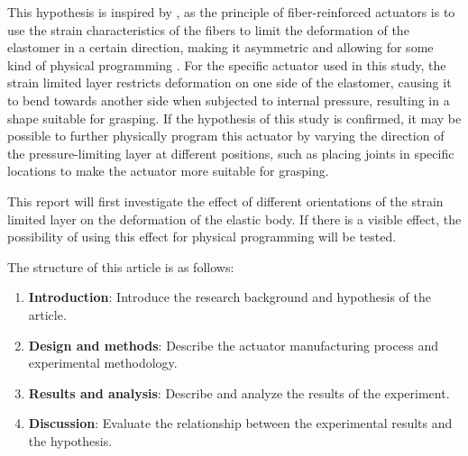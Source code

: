 \documentclass[conference]{IEEEtran}
\begin{document}
This hypothesis is inspired by \cite{mechanical_programing}, as the principle of fiber-reinforced actuators is to use the strain characteristics of the fibers to limit the deformation of the elastomer in a certain direction, making it asymmetric and allowing for some kind of physical programming \cite{fingerlike}. For the specific actuator used in this study, the strain limited layer restricts deformation on one side of the elastomer, causing it to bend towards another side when subjected to internal pressure, resulting in a shape suitable for grasping. If the hypothesis of this study is confirmed, it may be possible to further physically program this actuator by varying the direction of the pressure-limiting layer at different positions, such as placing joints in specific locations to make the actuator more suitable for grasping.


This report will first investigate the effect of different orientations of the strain limited layer on the deformation of the elastic body. If there is a visible effect, the possibility of using this effect for physical programming will be tested.


The structure of this article is as follows:
\begin{enumerate}
    \item \textbf{Introduction}: Introduce the research background and hypothesis of the article.
    \item \textbf{Design and methods}: Describe the actuator manufacturing process and experimental methodology.
    \item \textbf{Results and analysis}: Describe and analyze the results of the experiment.
    \item \textbf{Discussion}: Evaluate the relationship between the experimental results and the hypothesis.
\end{enumerate}










\end{document}
